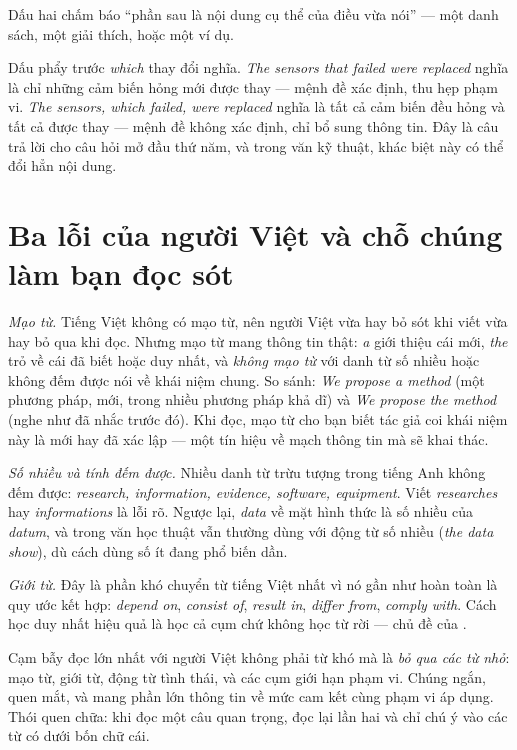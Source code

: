 \documentclass[../../english.tex]{subfiles}
\begin{document}
Dấu hai chấm báo ``phần sau là nội dung cụ thể của điều vừa nói'' --- một danh sách, một giải thích, hoặc một ví dụ.

Dấu phẩy trước \emph{which} thay đổi nghĩa. \emph{The sensors that failed were replaced} nghĩa là chỉ những cảm biến hỏng mới được thay --- mệnh đề xác định, thu hẹp phạm vi. \emph{The sensors, which failed, were replaced} nghĩa là tất cả cảm biến đều hỏng và tất cả được thay --- mệnh đề không xác định, chỉ bổ sung thông tin. Đây là câu trả lời cho câu hỏi mở đầu thứ năm, và trong văn kỹ thuật, khác biệt này có thể đổi hẳn nội dung.

\section{Ba lỗi của người Việt và chỗ chúng làm bạn đọc sót}

\emph{Mạo từ.} Tiếng Việt không có mạo từ, nên người Việt vừa hay bỏ sót khi viết vừa hay bỏ qua khi đọc. Nhưng mạo từ mang thông tin thật: \emph{a} giới thiệu cái mới, \emph{the} trỏ về cái đã biết hoặc duy nhất, và \emph{không mạo từ} với danh từ số nhiều hoặc không đếm được nói về khái niệm chung. So sánh: \emph{We propose a method} (một phương pháp, mới, trong nhiều phương pháp khả dĩ) và \emph{We propose the method} (nghe như đã nhắc trước đó). Khi đọc, mạo từ cho bạn biết tác giả coi khái niệm này là mới hay đã xác lập --- một tín hiệu về mạch thông tin mà  sẽ khai thác.

\emph{Số nhiều và tính đếm được.} Nhiều danh từ trừu tượng trong tiếng Anh không đếm được: \emph{research, information, evidence, software, equipment}. Viết \emph{researches} hay \emph{informations} là lỗi rõ. Ngược lại, \emph{data} về mặt hình thức là số nhiều của \emph{datum}, và trong văn học thuật vẫn thường dùng với động từ số nhiều (\emph{the data show}), dù cách dùng số ít đang phổ biến dần.

\emph{Giới từ.} Đây là phần khó chuyển từ tiếng Việt nhất vì nó gần như hoàn toàn là quy ước kết hợp: \emph{depend on}, \emph{consist of}, \emph{result in}, \emph{differ from}, \emph{comply with}. Cách học duy nhất hiệu quả là học cả cụm chứ không học từ rời --- chủ đề của .

\begin{cambay}
Cạm bẫy đọc lớn nhất với người Việt không phải từ khó mà là \emph{bỏ qua các từ nhỏ}: mạo từ, giới từ, động từ tình thái, và các cụm giới hạn phạm vi. Chúng ngắn, quen mắt, và mang phần lớn thông tin về mức cam kết cùng phạm vi áp dụng. Thói quen chữa: khi đọc một câu quan trọng, đọc lại lần hai và chỉ chú ý vào các từ có dưới bốn chữ cái.
\end{cambay}
\end{document}
